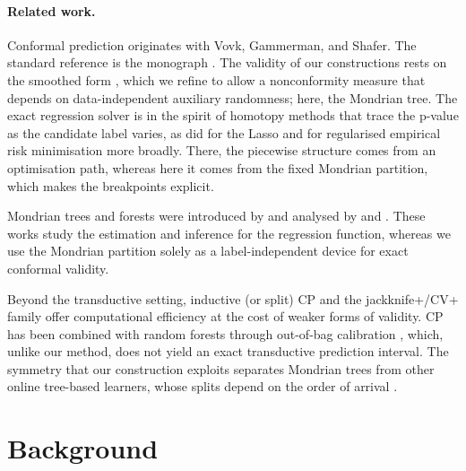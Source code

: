 \documentclass[twoside]{article}
\numberwithin{equation}{section}
\theoremstyle{plain}
\theoremstyle{definition}
\theoremstyle{remark}
\begin{document}
    \paragraph{Related work.}
    Conformal prediction originates with Vovk, Gammerman, and Shafer. The standard reference is the monograph \citet{alrw2}. The validity of our constructions rests on the smoothed form \citep[Prop. 2.4]{alrw2}, which we refine to allow a nonconformity measure that depends on data-independent auxiliary randomness; here, the Mondrian tree. The exact regression solver is in the spirit of homotopy methods that trace the p-value as the candidate label varies, as \citet{lei2019fast} did for the Lasso and \citet{ndiaye2019homotopy, ndiaye2022rootfinding} for regularised empirical risk minimisation more broadly. There, the piecewise structure comes from an optimisation path, whereas here it comes from the fixed Mondrian partition, which makes the breakpoints explicit.

    Mondrian trees and forests were introduced by \citet{lakshminarayanan2014mondrian} and analysed by \citet{mourtada2020minimax, mourtada2021amf} and \citet{cattaneo2026inference}. These works study the estimation and inference for the regression function, whereas we use the Mondrian partition solely as a label-independent device for exact conformal validity.

    Beyond the transductive setting, inductive (or split) CP \citep{papadopoulos2002inductive, lei2018distribution} and the jackknife+/CV+ family \citep{barber2021jackknife} offer computational efficiency at the cost of weaker forms of validity. CP has been combined with random forests through out-of-bag calibration \citep{johansson2014regression}, which, unlike our method, does not yield an exact transductive prediction interval. The symmetry that our construction exploits separates Mondrian trees from other online tree-based learners, whose splits depend on the order of arrival \citep{domingos2000mining, saffari2009online, gomes2017adaptive}.

\section{Background}\label{sec:background}
\end{document}
